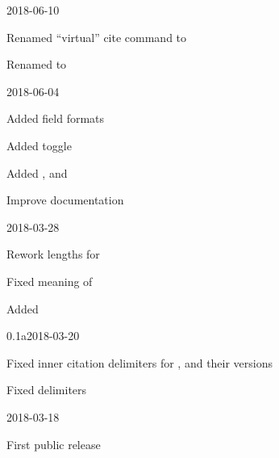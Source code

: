 \documentclass[DIV=9]{scrartcl}
\begin{document}
\begin{changelog}
\begin{release}{0.4}{2018-06-10}
  \item Renamed \enquote{virtual} cite command  to
  \item Renamed  to 
\end{release}
\begin{release}{0.3}{2018-06-04}
  \item Added 
    field formats
  \item Added  toggle%
  \item Added ,  and
  \item Improve documentation
\end{release}
\begin{release}{0.2}{2018-03-28}
  \item Rework lengths for 
  \item Fixed meaning of 
  \item Added 
\end{release}
\begin{release}{0.1a}{2018-03-20}
  \item Fixed inner citation delimiters for ,
     and their  versions%
  \item Fixed  delimiters
\end{release}
\begin{release}{0.1}{2018-03-18}
  \item First public release
\end{release}
\end{changelog}

\begin{bibexample}[breakable]
\printbibliography[heading=bibintoc, title={Example \refname}]
\end{bibexample}

\clearpage
\appendix
\end{document}
